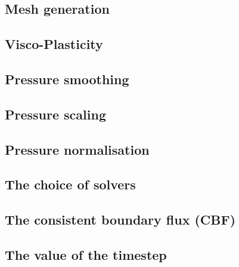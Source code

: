 \documentclass[a4paper]{article}
\begin{document}
\subsection{Mesh generation} \label{subsection_meshes}  %

\newpage %
\subsection{Visco-Plasticity}  %

\newpage %
\subsection{Pressure smoothing}  %

\newpage %
\subsection{Pressure scaling}  %

\newpage %
\subsection{Pressure normalisation}  %

\newpage %
\subsection{The choice of solvers\label{sec_solvers}}  %

\newpage %
\subsection{The consistent boundary flux (CBF)}  %

\newpage %
\subsection{The value of the timestep}  %
\end{document}
